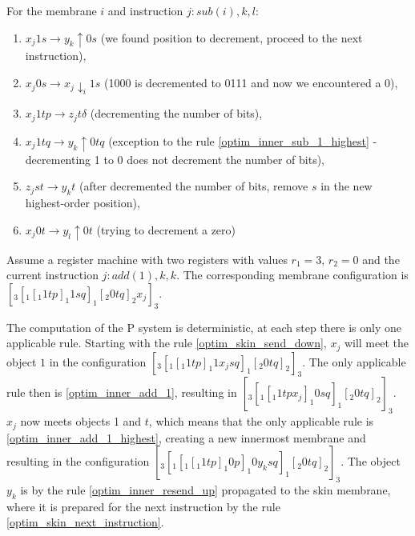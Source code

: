     For the membrane $i$ and instruction $j: sub(i),k,l$:
    \begin{enumerate}[resume]
      \item\label{optim_inner_sub_1} $x_j1s \rightarrow y_k \uparrow 0s$ (we found position to decrement, proceed to the next instruction),
      \item\label{optim_inner_sub_0} $x_j0s \rightarrow x_j\downarrow_i 1s$ (1000 is decremented to 0111 and now we encountered a 0),
      \item\label{optim_inner_sub_1_highest} $x_j1tp \rightarrow z_jt \delta$ (decrementing the number of bits),
      \item\label{optim_inner_sub_1_highest_1} $x_j1tq \rightarrow y_k\uparrow 0tq$ (exception to the rule \ref{optim_inner_sub_1_highest} - decrementing 1 to 0 does not decrement the number of bits),
      \item\label{optim_inner_sub_remove_s} $z_jst \rightarrow y_kt$ (after decremented the number of bits, remove $s$ in the new highest-order position),
      \item\label{optim_inner_sub_0_highest} $x_j0t \rightarrow y_l \uparrow 0t$ (trying to decrement a zero)
    \end{enumerate}

    \begin{example}
      Assume a register machine with two registers with values $r_1=3$, $r_2=0$ and the current instruction $j: add(1),k,k$. The corresponding membrane configuration is $[_3 [_1 [_1 1 t p ]_1 1 s q ]_1 [_2 0 t q ]_2 x_j ]_3$.

      The computation of the P system is deterministic, at each step there is only one applicable rule. Starting with the rule \ref{optim_skin_send_down}, $x_j$ will meet the object $1$ in the configuration $[_3 [_1 [_1 1 t p ]_1 1 x_j s q ]_1 [_2 0 t q ]_2 ]_3$. The only applicable rule then is \ref{optim_inner_add_1}, resulting in $[_3 [_1 [_1 1 t p x_j ]_1 0 s q ]_1 [_2 0 t q ]_2 ]_3$. $x_j$ now meets objects 1 and $t$, which means that the only applicable rule is \ref{optim_inner_add_1_highest}, creating a new innermost membrane and resulting in the configuration $[_3 [_1 [_1 [_1 1 t p ]_1 0 p ]_1 0 y_k s q ]_1 [_2 0 t q ]_2 ]_3$. The object $y_k$ is by the rule \ref{optim_inner_resend_up} propagated to the skin membrane, where it is prepared for the next instruction by the rule \ref{optim_skin_next_instruction}.
    \end{example}

